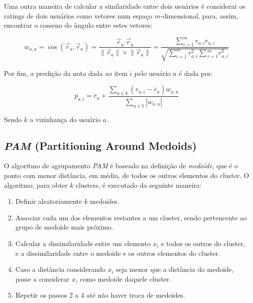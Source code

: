 \documentclass[12pt,a4paper,header]{abnt}
\begin{document}
Uma outra maneira de calcular a similaridade entre dois usuários é considerar os ratings de dois usuários como vetores num espaço $m$-dimensional, para, assim, encontrar o cosseno do ângulo entre estes vetores\cite{melville2011recommender}:

\begin{equation}
w_{a, u} = \cos({\vec{r}_a, \vec{r}_u}) = \frac{\vec{r}_a \boldsymbol{\cdot} \vec{r}_u}{\lVert \vec{r}_a\rVert \times \lVert \vec{r}_u\rVert} = \frac{\sum_{i=1}^{m}{r_{a, i} r_{u, i}}}{\sqrt{\sum_{i=1}^{m}{r^2_{a, i}} \sum{_{i=1}^{m}{r^2_{u, i}}}}}
\end{equation}

Por fim, a predição da nota dada ao item $i$ pelo usuário $a$ é dada por:

\begin{equation}
p_{a, i} = \overline{r}_a + \frac{\sum_{u \in k}{(r_{u, i} - \overline{r}_u) w_{a, u}}}{\sum_{u \in k}{\left|w_{a, u}\right|}}
\end{equation}

Sendo $k$ a vizinhança do usuário $a$.

\subsection{\textit{PAM} (Partitioning Around Medoids)}

O algoritmo de agrupamento \textit{PAM} é baseado na definição de \textit{medoide}, que é o ponto com menor distância, em média, de todos os outros elementos do cluster. O algoritmo, para obter $k$ clusters, é executado da seguinte maneira\cite{do2005agrupamentos}:

\begin{enumerate}

\item{Definir aleatoriamente $k$ medoides.}
\item{Associar cada um dos elementos restantes a um cluster, sendo pertencente ao grupo de medoide mais próximo.}
\item{Calcular a dissimilaridade entre um elemento $x_i$ e todos os outros do cluster, e a dissimilaridade entre o medoide e os outros elementos do cluster.}
\item{Caso a distância considerando $x_i$ seja menor que a distância do medoide, passe a considerar $x_i$ como medoide daquele cluster.}
\item{Repetir os passos 2 a 4 até não haver troca de medoides.}

\end{enumerate}
\end{document}
